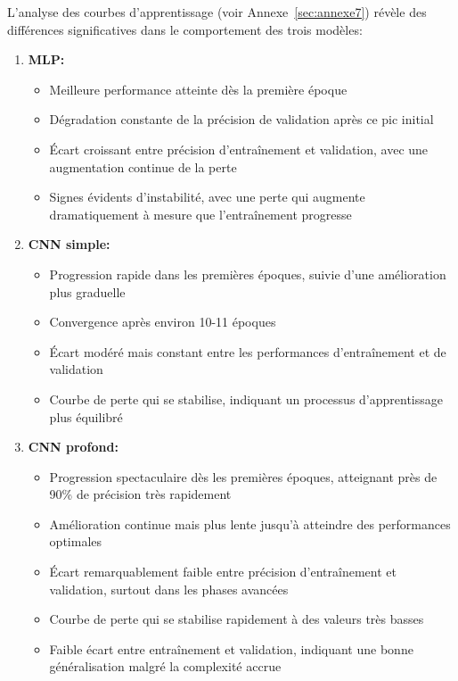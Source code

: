 L'analyse des courbes d'apprentissage (voir Annexe~\ref{sec:annexe7}) révèle des différences significatives dans le comportement des trois modèles:


\begin{enumerate}
\item \textbf{MLP:}
\begin{itemize}
\item Meilleure performance atteinte dès la première époque
\item Dégradation constante de la précision de validation après ce pic initial
\item Écart croissant entre précision d'entraînement et validation, avec une augmentation continue de la perte
\item Signes évidents d'instabilité, avec une perte qui augmente dramatiquement à mesure que l'entraînement progresse
\end{itemize}

\item \textbf{CNN simple:}
\begin{itemize}
\item Progression rapide dans les premières époques, suivie d'une amélioration plus graduelle
\item Convergence après environ 10-11 époques
\item Écart modéré mais constant entre les performances d'entraînement et de validation
\item Courbe de perte qui se stabilise, indiquant un processus d'apprentissage plus équilibré
\end{itemize}

\item \textbf{CNN profond:}
\begin{itemize}
\item Progression spectaculaire dès les premières époques, atteignant près de 90\% de précision très rapidement
\item Amélioration continue mais plus lente jusqu'à atteindre des performances optimales
\item Écart remarquablement faible entre précision d'entraînement et validation, surtout dans les phases avancées
\item Courbe de perte qui se stabilise rapidement à des valeurs très basses
\item Faible écart entre entraînement et validation, indiquant une bonne généralisation malgré la complexité accrue
\end{itemize}
\end{enumerate}

